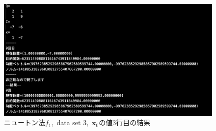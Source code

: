 \documentclass[12pt]{jarticle}
\begin{document}
\begin{figure}[h]
    \begin{center}
        \includegraphics[scale=0.2]{kadai1_1n_out3_3_1.png}
    \end{center}
    \caption{ニュートン法$f_1$,\ data set 3,\ $\boldsymbol{x}_0$の値3行目の結果}
\end{figure}
\end{document}
